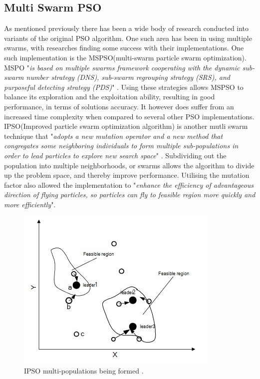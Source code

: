 \documentclass[oneside,12pt]{book}
\begin{document}
\subsection{Multi Swarm PSO}
As mentioned previously there has been a wide body of research conducted into variants of the original PSO algorithm. One such area has been in using multiple swarms, with researches finding some success with their implementations. One such implementation is the MSPSO(multi-swarm particle swarm optimization).  MSPO "\textit{is based on multiple swarms framework cooperating with the dynamic sub-swarm number strategy (DNS), sub-swarm regrouping strategy (SRS), and purposeful detecting strategy (PDS)}" \cite{XIA2018126}. Using these strategies allows MSPSO to balance its exploration and the exploitation ability, resulting in good performance, in terms of solutions accuracy. It however does suffer from an increased time complexity when compared to several other PSO implementations. 
IPSO(Improved  particle  swarm  optimization   algorithm) is another mutli swarm technique that "\textit{adopts   a   new   mutation  operator  and  a  new  method  that  congregates  some  neighboring  individuals  to  form  multiple  sub-populations  in  order  to  lead  particles  to  explore  new  search space}" \cite{zheng2007improved}. Subdividing out the population into multiple neighborhoods, or swarms allows the algorithm to divide up the problem space, and thereby improve performance. Utilising the mutation factor also allowed the implementation to "\textit{enhance the efficiency of advantageous direction of flying particles, so particles can fly to feasible region more quickly and more efficiently}".
\begin{figure}[H]
    \centering
    \includegraphics[scale=1.0]{Images/IpsoFormingSwarms.png}
    \caption{IPSO multi-populations being formed . \cite{zheng2007improved} }
    \label{fig:IPSO multi-populations being formed.}
\end{figure}
\end{document}
